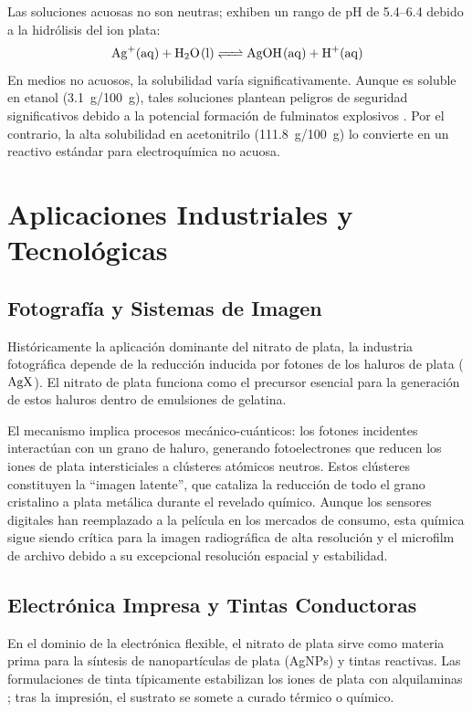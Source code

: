 \documentclass[pdflatex,sn-mathphys-num,draft]{sn-jnl}
\theoremstyle{thmstyleone}%
\theoremstyle{thmstyletwo}%
\theoremstyle{thmstylethree}%
\begin{document}
Las soluciones acuosas no son neutras; exhiben un rango de pH de
\numrange{5.4}{6.4} debido a la hidrólisis del ion plata:
\begin{equation}
  \ce{Ag+(aq) + H2O(l) <=> AgOH(aq) + H+(aq)}
\end{equation}
En medios no acuosos, la solubilidad varía significativamente. Aunque es soluble
en etanol (\qty{3.1}{\gram}/\qty{100}{\gram}), tales soluciones plantean
peligros de seguridad significativos debido a la potencial formación de
fulminatos explosivos \cite{CameoChemicals}. Por el contrario, la alta solubilidad en acetonitrilo
(\qty{111.8}{\gram}/\qty{100}{\gram}) lo convierte en un reactivo estándar para
electroquímica no acuosa.

\section{Aplicaciones Industriales y Tecnológicas}
\label{sec:applications}

\subsection{Fotografía y Sistemas de Imagen}
Históricamente la aplicación dominante del nitrato de plata, la industria
fotográfica depende de la reducción inducida por fotones de los haluros de
plata ($\ce{AgX}$). El nitrato de plata funciona como el precursor esencial para
la generación de estos haluros dentro de emulsiones de gelatina.

El mecanismo implica procesos mecánico-cuánticos: los fotones incidentes
interactúan con un grano de haluro, generando fotoelectrones que reducen los
iones de plata intersticiales a clústeres atómicos neutros. Estos clústeres
constituyen la ``imagen latente'', que cataliza la reducción de todo el grano
cristalino a plata metálica durante el revelado químico. Aunque los sensores
digitales han reemplazado a la película en los mercados de consumo, esta
química sigue siendo crítica para la imagen radiográfica de alta resolución y el
microfilm de archivo debido a su excepcional resolución espacial y estabilidad.

\subsection{Electrónica Impresa y Tintas Conductoras}
En el dominio de la electrónica flexible, el nitrato de plata sirve como materia
prima para la síntesis de nanopartículas de plata (AgNPs) y tintas reactivas.
Las formulaciones de tinta típicamente estabilizan los iones de plata con
alquilaminas \cite{Yang2017}; tras la impresión, el sustrato se somete a curado
térmico o químico.
\end{document}
